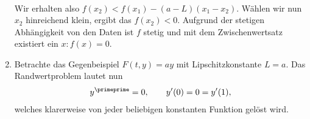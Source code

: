 \begin{solution}
\begin{enumerate}[label = \textbf{\alph*)}]
\begin{align*}
  \end{align*}
  Wir erhalten also $f(x_2) < f(x_1) - (a-L)(x_1 - x_2)$.
  Wählen wir nun $x_2$ hinreichend klein, ergibt das $f(x_2) < 0.$
  Aufgrund der stetigen Abhängigkeit von den Daten ist $f$ stetig und mit dem Zwischenwertsatz
  existiert ein $x: f(x) = 0$.
  \item Betrachte das Gegenbeispiel $F(t,y) = ay$ mit Lipschitzkonstante $L = a$. Das Randwertproblem lautet nun
  \begin{align*}
    y^{\primeprime} = 0, \qquad y^{\prime}(0) = 0 = y^{\prime}(1),
  \end{align*}
  welches klarerweise von jeder beliebigen konstanten Funktion gelöst wird.
\end{enumerate}
\end{solution}
